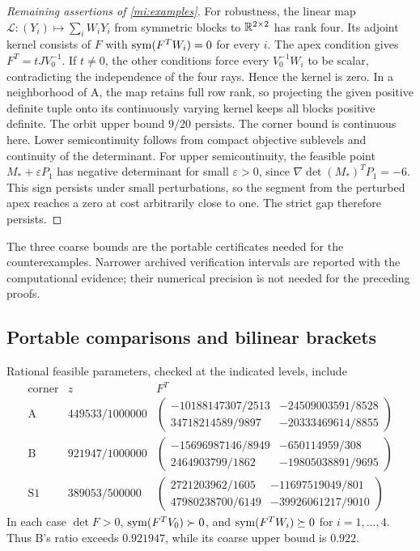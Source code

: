 \begin{proof}[Remaining assertions of \cref{mi:examples}]
For robustness, the linear map
$\mathcal L:(Y_i)\mapsto\sum_iW_iY_i$ from symmetric blocks to
$\mathbb R^{2\times2}$ has rank four. Its adjoint kernel consists of $F$ with
$\operatorname{sym}(F^TW_i)=0$ for every $i$.
The apex condition gives $F^T=tJV_0^{-1}$. If $t\ne0$, the other
conditions force every $V_0^{-1}W_i$ to be scalar, contradicting the
independence of the four rays. Hence the kernel is zero.
In a neighborhood of A, the map retains full row rank, so projecting the
given positive definite tuple onto its continuously varying kernel keeps
all blocks positive definite. The orbit upper bound $9/20$ persists.
The corner bound is continuous here. Lower semicontinuity follows from
compact objective sublevels and continuity of the determinant. For upper
semicontinuity, the feasible point $M_*+\varepsilon P_1$ has negative
determinant for small $\varepsilon>0$, since
$\nabla\det(M_*)^TP_1=-6$. This sign persists under small perturbations,
so the segment from the perturbed apex reaches a zero at cost arbitrarily
close to one. The strict gap therefore persists.
\end{proof}

The three coarse bounds are the portable certificates needed for the
counterexamples. Narrower archived verification intervals are reported
with the computational evidence; their numerical precision is not needed
for the preceding proofs.

\subsection{Portable comparisons and bilinear brackets}\label{mi:comparison-certificates}

Rational feasible parameters, checked at the indicated levels, include
\[
\begin{array}{c|c|c}
\text{corner}&z&F^T\\\hline
\mathrm A&449533/1000000&
\begin{pmatrix}-10188147307/2513&-24509003591/8528\\
34718214589/9897&-20333469614/8855\end{pmatrix}\\[6pt]
\mathrm B&921947/1000000&
\begin{pmatrix}-15696987146/8949&-650114959/308\\
2464903799/1862&-19805038891/9695\end{pmatrix}\\[6pt]
\mathrm{S1}&389053/500000&
\begin{pmatrix}2721203962/1605&-11697519049/801\\
47980238700/6149&-39926061217/9010\end{pmatrix}
\end{array}
\]
In each case $\det F>0$, $\operatorname{sym}(F^TV_0)\succ0$, and
$\operatorname{sym}(F^TW_i)\succeq0$ for $i=1,\ldots,4$.
Thus B's ratio exceeds $0.921947$, while its coarse upper bound is $0.922$.

